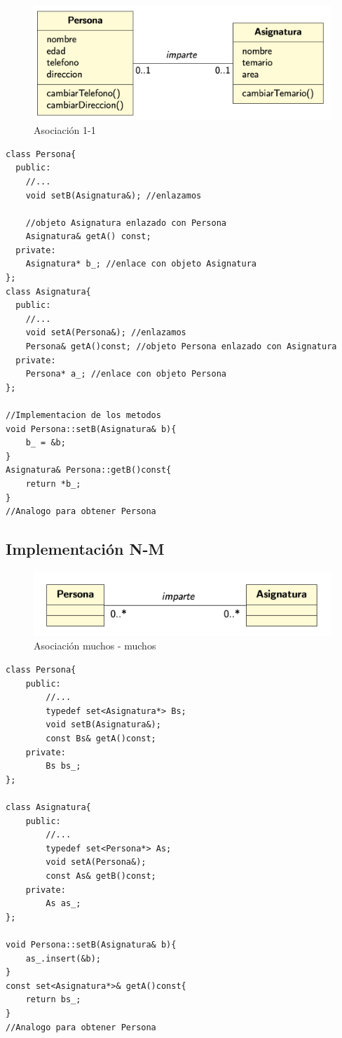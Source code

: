 \begin{figure}[h]
    \centering
	\includegraphics[width=\textwidth]{Imagenes/asociacion1.png}
    \caption{Asociación 1-1}
\end{figure}
\begin{center}
	\begin{lstlisting}[frame=single]
class Persona{
  public:
    //...
    void setB(Asignatura&); //enlazamos
    
    //objeto Asignatura enlazado con Persona
    Asignatura& getA() const; 
  private:
    Asignatura* b_; //enlace con objeto Asignatura
};
class Asignatura{
  public:
    //...
    void setA(Persona&); //enlazamos
    Persona& getA()const; //objeto Persona enlazado con Asignatura
  private:
    Persona* a_; //enlace con objeto Persona
};

//Implementacion de los metodos
void Persona::setB(Asignatura& b){
    b_ = &b;
}
Asignatura& Persona::getB()const{
    return *b_;
}
//Analogo para obtener Persona
\end{lstlisting}
\end{center}


\newpage
\subsection{Implementación N-M}
\begin{figure}[h]
    \centering
    \includegraphics[width=\textwidth]{Imagenes/asociacion2.png}
    \caption{Asociación muchos - muchos}
\end{figure}

\begin{center}
	\begin{lstlisting}[frame=single]
class Persona{
    public:
        //...
        typedef set<Asignatura*> Bs;
        void setB(Asignatura&);
        const Bs& getA()const;
    private:
        Bs bs_; 
};

class Asignatura{
    public:
        //...
        typedef set<Persona*> As;
        void setA(Persona&);
        const As& getB()const;
    private:
        As as_;
};

void Persona::setB(Asignatura& b){
    as_.insert(&b);
}
const set<Asignatura*>& getA()const{
    return bs_;
}
//Analogo para obtener Persona
\end{lstlisting}
\end{center}

